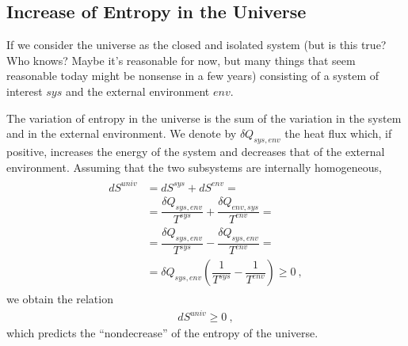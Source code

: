 \documentclass[letterpaper,10pt,english]{jupyterBook}
\begin{document}
\subsection{Increase of Entropy in the Universe}
\label{\detokenize{ch/principles-second:increase-of-entropy-in-the-universe}}\label{\detokenize{ch/principles-second:physics-hs-thermodynamics-principles-second-universe}}
\sphinxAtStartPar
If we consider the universe as the closed and isolated system (but is this true? Who knows? Maybe it’s reasonable for now, but many things that seem reasonable today might be nonsense in a few years) consisting of a system of interest \(sys\) and the external environment \(env\).

\sphinxAtStartPar
The variation of entropy in the universe is the sum of the variation in the system and in the external environment. We denote by \(\delta Q_{sys,env}\) the heat flux which, if positive, increases the energy of the system and decreases that of the external environment. Assuming that the two subsystems are internally homogeneous,
\begin{equation*}
\begin{split}\begin{aligned}
d S^{univ} & = d S^{sys} + d S^{env} = \\
           & = \dfrac{\delta Q_{sys,env}}{T^{sys}} + \dfrac{\delta Q_{env,sys}}{T^{env}} = \\
           & = \dfrac{\delta Q_{sys,env}}{T^{sys}} - \dfrac{\delta Q_{sys,env}}{T^{env}} = \\
           & = \delta Q_{sys,env} \left( \dfrac{1}{T^{sys}} - \dfrac{1}{T^{env}} \right) \ge 0 \ ,
\end{aligned}\end{split}
\end{equation*}
\sphinxAtStartPar
we obtain the relation
\begin{equation*}
\begin{split}dS^{univ} \ge 0 \ ,\end{split}
\end{equation*}
\sphinxAtStartPar
which predicts the “non\sphinxhyphen{}decrease” of the entropy of the universe.

\sphinxstepscope
\end{document}
